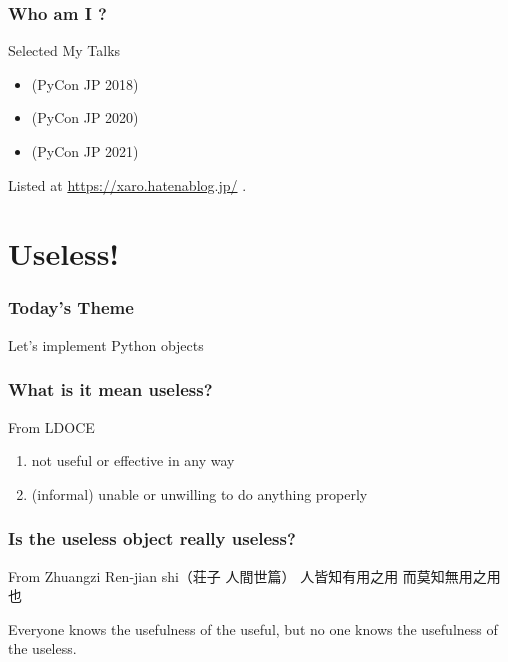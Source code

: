 \documentclass[aspectratio=169,dvipdfmx,12pt,notheorems]{beamer}
\theoremstyle{definition}
\begin{document}
\begin{frame}\frametitle{Who am I ?}

\begin{block}{Selected My Talks}
\begin{itemize}
\item {}(PyCon JP 2018)
\item {}(PyCon JP 2020)
\item {}(PyCon JP 2021)
\end{itemize}
\end{block}
Listed at \url{https://xaro.hatenablog.jp/} .
\end{frame}

\section{Useless!}

\begin{frame}\frametitle{Today's Theme}

\begin{center}
\Huge{Let's implement  Python objects}
\end{center}

\end{frame}

\begin{frame}\frametitle{What is it mean useless?}

\begin{block}{From LDOCE}
\begin{enumerate}
\item not useful or effective in any way
\item (informal) unable or unwilling to do anything properly
\end{enumerate}
\end{block}

\end{frame}

\begin{frame}\frametitle{Is the useless object really useless?}

\begin{block}{From Zhuangzi Ren-jian shi（荘子 人間世篇）}
人皆知有用之用 而莫知無用之用也
\end{block}
Everyone knows the usefulness of the useful, but no one knows the usefulness of the useless.

\end{frame}
\end{document}
